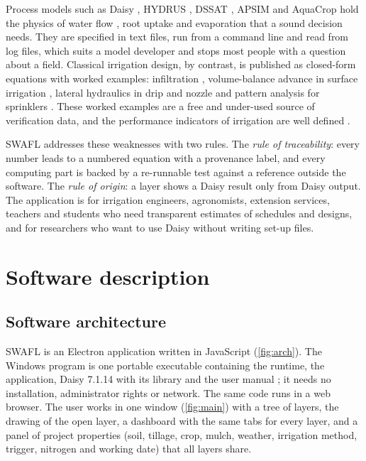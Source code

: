 \documentclass[preprint,12pt]{elsarticle}
\begin{document}
Process models such as Daisy \cite{Hansen1990,Hansen1991,Abrahamsen2000,Hansen2012,Holbak2026}, HYDRUS \cite{Simunek2008,Simunek2016}, DSSAT \cite{Jones2003}, APSIM \cite{Keating2003} and AquaCrop \cite{Steduto2009} hold the physics of water flow \cite{Richards1931,vanGenuchten1980,Mualem1976}, root uptake \cite{Feddes1978} and evaporation \cite{Monteith1965,Ritchie1972,Allen1998} that a sound decision needs. They are specified in text files, run from a command line and read from log files, which suits a model developer and stops most people with a question about a field. Classical irrigation design, by contrast, is published as closed-form equations with worked examples: infiltration \cite{Kostiakov1932,Philip1957,GreenAmpt1911}, volume-balance advance in surface irrigation \cite{Elliott1982,Walker1987,Walker1989}, lateral hydraulics in drip \cite{KellerKarmeli1974,Keller1990,Hazen1905} and nozzle and pattern analysis for sprinklers \cite{Christiansen1942,Playan2005}. These worked examples are a free and under-used source of verification data, and the performance indicators of irrigation are well defined \cite{Burt1997}.

SWAFL addresses these weaknesses with two rules. The \emph{rule of traceability}: every number leads to a numbered equation with a provenance label, and every computing part is backed by a re-runnable test against a reference outside the software. The \emph{rule of origin}: a layer shows a Daisy result only from Daisy output. The application is for irrigation engineers, agronomists, extension services, teachers and students who need transparent estimates of schedules and designs, and for researchers who want to use Daisy without writing set-up files.

\section{Software description}
\subsection{Software architecture}
SWAFL is an Electron application written in JavaScript (\cref{fig:arch}). The Windows program is one portable executable containing the runtime, the application, Daisy 7.1.14 with its library and the user manual \cite{HaliluManual}; it needs no installation, administrator rights or network. The same code runs in a web browser. The user works in one window (\cref{fig:main}) with a tree of layers, the drawing of the open layer, a dashboard with the same tabs for every layer, and a panel of project properties (soil, tillage, crop, mulch, weather, irrigation method, trigger, nitrogen and working date) that all layers share.
\end{document}
